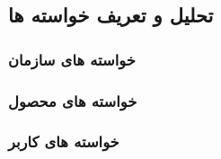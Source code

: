 \subsection{تحلیل و تعریف خواسته ها}

\subsubsection{خواسته های سازمان}
\subsubsection{خواسته های محصول}
\subsubsection{خواسته های کاربر}

